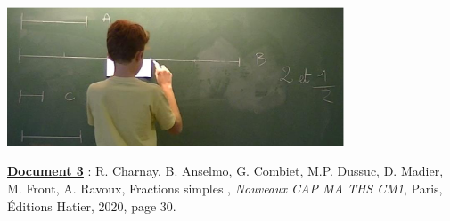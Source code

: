 \begin{center}
   \includegraphics[width=10cm]{Nombres_et_calculs_did/Images/Num4_crpe_fractions_IREM}
\end{center}


{\bf\uline{Document 3}} : R. Charnay, B. Anselmo, G. Combiet, M.P. Dussuc, D. Madier, M. Front, A. Ravoux, \og Fractions simples \fg, {\it Nouveaux CAP MA THS CM1}, Paris, Éditions Hatier, 2020, page 30.

\begin{center}
\end{center}


